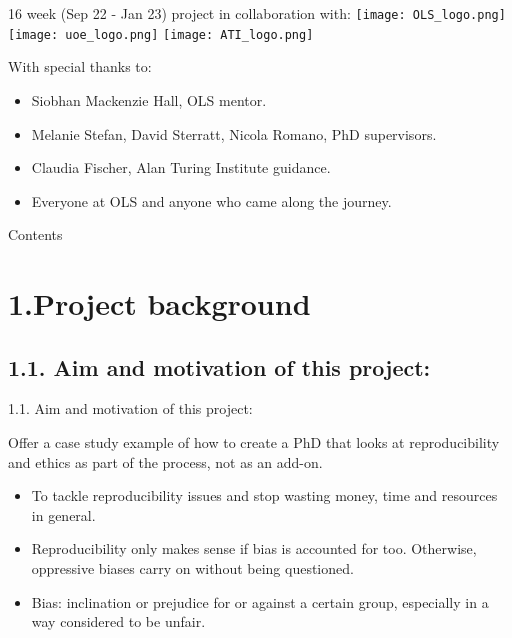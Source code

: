 \documentclass[t]{beamer}
\subtitle{Ethical standards and reproducibility of computer models in Neurobiology}
\date{19/01/2023}
\author{Susana Roman Garcia}
\begin{document}
\begin{frame}
	\titlepage
\end{frame}

\begin{frame}{16 week (Sep 22 - Jan 23) project in collaboration with:}
    \hfill \break
	\texttt{[image: OLS\_logo.png]}
        \texttt{[image: uoe\_logo.png]}
        \texttt{[image: ATI\_logo.png]}
\end{frame}

\begin{frame}{With special thanks to:}
    \begin{itemize}
        \item Siobhan Mackenzie Hall, OLS mentor.

        \item Melanie Stefan, David Sterratt, Nicola Romano, PhD supervisors.

        \item Claudia Fischer, Alan Turing Institute guidance.

        \item Everyone at OLS and anyone who came along the journey.
    \end{itemize}
\end{frame}

\begin{frame}{Contents}
	\tableofcontents
\end{frame}

\section{1.Project background}
\subsection{1.1. Aim and motivation of this project:}
\begin{frame}{1.1. Aim and motivation of this project:}
	\begin{block}{Offer a case study example of how to create a PhD that looks at reproducibility and ethics as part of the process, not as an add-on.}
        \hfill \break
  		\begin{itemize}    
  			\item To tackle reproducibility issues and stop wasting money, time and resources in general.
  			\item Reproducibility only makes sense if bias is accounted for too. Otherwise, oppressive biases carry on without being questioned.
                \item Bias: inclination or prejudice for or against a certain group, especially in a way considered to be unfair.
  		\end{itemize}    
	\end{block}
\end{frame}
\end{document}
